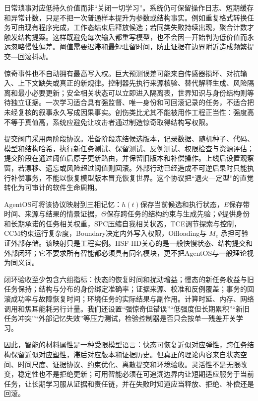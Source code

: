 日常琐事对应低持久价值而非“关闭一切学习”。系统仍可保留操作日志、短期缓存和异常计数，只是不把一次普通样本提升为参数或结构事实。例如重复格式转换任务可由现有程序完成，工作态结束后释放候选；若同类失败持续出现，聚合计数才触发结构提案。这样既避免每次输入都重写模型，也不会因一开始判为低价值而永远忽略慢性偏差。阈值需要迟滞和最短驻留时间，防止证据在边界附近造成频繁提交—回滚抖动。

惊奇事件也不自动拥有最高写入权。巨大预测误差可能来自传感器损坏、对抗输入、上下文缺失或真正的新规律。控制器先执行来源核验、替代解释生成、风险隔离和最小必要更新；安全相关状态可以立即进入隔离表，世界知识与身份结构则等待独立证据。一次学习适合具有强监督、唯一身份和可回滚记录的任务，不适合把未经复核的叙事永久写成因果事实。创伤类比尤其不能被用作工程正当性：强度高不等于真值高，系统应避免让攻击者通过制造惊奇取得结构写权限。

提交阀门采用两阶段协议。准备阶段冻结候选版本，记录数据、随机种子、代码、模型和结构哈希，执行新任务测试、保留测试、反例测试、权限检查与资源评估；提交阶段在通过阈值后原子更新路由，并保留旧版本和补偿操作。上线后设置观察窗，若漂移、遗忘或风险超过阈值则回滚。外部行动已经造成不可逆后果时只能执行补偿事务，不能以恢复模型版本冒充恢复世界。这个协议把“退火—定型”的直觉转化为可审计的软件生命周期。

AgentOS可将该协议映射到三相记忆：$h(t)$保存当前候选和执行状态，$E$保存带时间、来源与结果的情景证据，$\Theta$保存跨任务的结构约束与生成先验；$\Psi$提供身份和长期承诺的任务相关权重，SPC压缩自我相关状态，TCE调节探索与控制，CCM约束运行复杂度，Boundary决定内外写入权限，Offloading与 $M_e$ 承担可验证外部存储。该映射只是工程实例。HSF-HD关心的是一般快慢状态、结构提交和外部闭环；它不要求所有智能都必须具有同名模块，更不把AgentOS与一般理论视为同义词。

闭环验收至少包含六组指标：快态的恢复时间和扰动增益；慢态的新任务收益与旧任务保持；结构与分布的身份绑定准确率；证据来源、校准和反例覆盖；事务的回滚成功率与故障恢复时间；环境任务的实际结果与副作用。计算时延、内存、网络调用和焦耳能耗另行计量。我们还设置“强惊奇但错误”“低强度但长期累积”“新旧任务冲突”“外部记忆失效”等压力测试，检验控制器是否只会按单一残差开关学习。

因此，智能的材料属性是一种受限模型语言：快态可恢复近似对应弹性，跨任务结构保留近似对应塑性，滞后对应版本和证据历史。但真正的理论内容来自状态空间、时间尺度、证据协议、约束优化、离散提交和环境验收。灵活性不是无限改变，稳定性也不是拒绝更新；可用智能必须在可追溯边界内让短期适应服务于当前任务，让长期学习服从证据和责任链，并在失败时知道应当释放、拒绝、补偿还是回滚。
